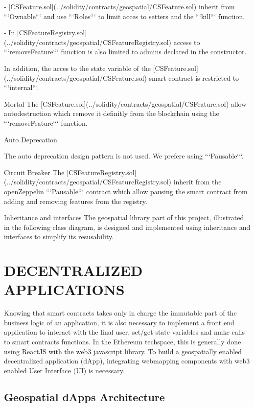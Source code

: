 \documentclass{isprs} %
\begin{document}
- [CSFeature.sol](../solidity/contracts/geospatial/CSFeature.sol) inherit from ```Ownable``` and use ```Roles``` to limit acces to setters and the ```kill``` function.

- In [CSFeatureRegistry.sol](../solidity/contracts/geospatial/CSFeatureRegistry.sol) access to ```removeFeature``` function is also limited to admins declared in the constructor. 

In addition, the acces to the state variable of the [CSFeature.sol](../solidity/contracts/geospatial/CSFeature.sol) smart contract is restricted to ```internal```.

Mortal
The [CSFeature.sol](../solidity/contracts/geospatial/CSFeature.sol) allow autodestruction which remove it definitly from the blockchain using the  ```removeFeature``` function.

Auto Deprecation

The auto deprecation design pattern is not used. We prefere using ```Pausable```. 

Circuit Breaker
The [CSFeatureRegistry.sol](../solidity/contracts/geospatial/CSFeatureRegistry.sol) inherit from the openZeppelin ```Pausable``` contract which allow pausing the smart contract from adding and removing features from the registry.  

Inheritance and interfaces 
The geospatial library part of this project, illustrated in the following class diagram, is designed and implemented using inheritance and interfaces to simplify its resusability.


\newpage
\section{DECENTRALIZED APPLICATIONS}\label{sec:DECENTRALIZED APPLICATIONS}

Knowing that smart contracts takes only in charge the immutable part of the business logic of an application, it is also necessary to implement a front end application to interact with the final user, set/get state variables and make calls to smart contracts functions. In the Ethereum techspace, this is generally done using ReactJS with the web3 javascript library. To build a geospatially enabled decentralized application (dApp), integrating webmapping components with web3 enabled User Interface (UI) is necessary.
 
\subsection{Geospatial dApps Architecture}\label{sec:Geospatial dApps Architecture}
\end{document}
